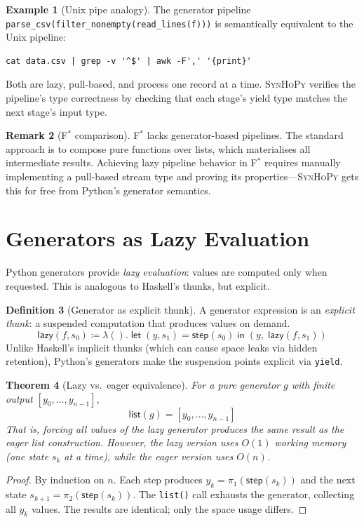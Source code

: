 \documentclass[11pt,a4paper]{report}
\theoremstyle{definition}
\newtheorem{definition}{Definition}[chapter]
\newtheorem{example}[definition]{Example}
\newtheorem{remark}[definition]{Remark}
\theoremstyle{plain}
\newtheorem{theorem}[definition]{Theorem}
\newcommand{\defeq}{\coloneqq}
\newcommand{\fstar}{F$^{*}$}
\newcommand{\synhopy}{\textsc{SynHoPy}}
\begin{document}
\begin{example}[Unix pipe analogy]
The generator pipeline \texttt{parse\_csv(filter\_nonempty(read\_lines(f)))}
is semantically equivalent to the Unix pipeline:
\begin{verbatim}
cat data.csv | grep -v '^$' | awk -F',' '{print}'
\end{verbatim}
Both are lazy, pull-based, and process one record at a time.  \synhopy{}
verifies the pipeline's type correctness by checking that each stage's
yield type matches the next stage's input type.
\end{example}

\begin{remark}[\fstar{} comparison]
\fstar{} lacks generator-based pipelines.  The standard approach is to
compose pure functions over lists, which materialises all intermediate
results.  Achieving lazy pipeline behavior in \fstar{} requires manually
implementing a pull-based stream type and proving its properties---\synhopy{}
gets this for free from Python's generator semantics.
\end{remark}

\section{Generators as Lazy Evaluation}

Python generators provide \emph{lazy evaluation}: values are computed only
when requested.  This is analogous to Haskell's thunks, but explicit.

\begin{definition}[Generator as explicit thunk]
A generator expression is an \emph{explicit thunk}: a suspended computation
that produces values on demand.
\[
  \mathsf{lazy}(f, s_0) \defeq
  \lambda().\; \mathsf{let}\;(y, s_1) = \mathsf{step}(s_0)\;\mathsf{in}\;
    (y,\; \mathsf{lazy}(f, s_1))
\]
Unlike Haskell's implicit thunks (which can cause space leaks via hidden
retention), Python's generators make the suspension points explicit via
\texttt{yield}.
\end{definition}

\begin{theorem}[Lazy vs.\ eager equivalence]
For a pure generator $g$ with finite output $[y_0, \ldots, y_{n-1}]$,
\[
  \mathsf{list}(g) = [y_0, \ldots, y_{n-1}]
\]
That is, forcing all values of the lazy generator produces the same result
as the eager list construction.  However, the lazy version uses $O(1)$
working memory (one state $s_k$ at a time), while the eager version
uses $O(n)$.
\end{theorem}
\begin{proof}
By induction on $n$.  Each step produces $y_k = \pi_1(\mathsf{step}(s_k))$
and the next state $s_{k+1} = \pi_2(\mathsf{step}(s_k))$.  The
\texttt{list()} call exhausts the generator, collecting all $y_k$ values.
The results are identical; only the space usage differs.
\end{proof}
\end{document}
